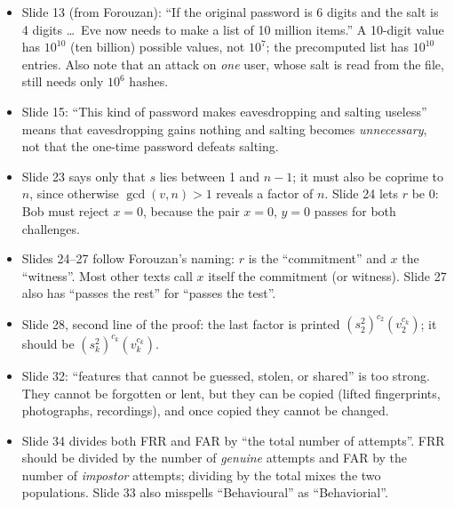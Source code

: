 \begin{fixbox}
\begin{itemize}
  \item Slide 13 (from Forouzan): ``If the original password is 6 digits and the salt is 4 digits \dots\ Eve now needs to make a list of 10 million items.'' A 10-digit value has $10^{10}$ (ten billion) possible values, not $10^{7}$; the precomputed list has $10^{10}$ entries. Also note that an attack on \emph{one} user, whose salt is read from the file, still needs only $10^6$ hashes.
  \item Slide 15: ``This kind of password makes eavesdropping and salting useless'' means that eavesdropping gains nothing and salting becomes \emph{unnecessary}, not that the one-time password defeats salting.
  \item Slide 23 says only that $s$ lies between 1 and $n - 1$; it must also be coprime to $n$, since otherwise $\gcd(v, n) > 1$ reveals a factor of $n$. Slide 24 lets $r$ be 0: Bob must reject $x = 0$, because the pair $x = 0$, $y = 0$ passes for both challenges.
  \item Slides 24--27 follow Forouzan's naming: $r$ is the ``commitment'' and $x$ the ``witness''. Most other texts call $x$ itself the commitment (or witness). Slide 27 also has ``passes the rest'' for ``passes the test''.
  \item Slide 28, second line of the proof: the last factor is printed $(s_2^2)^{c_2}(v_2^{c_k})$; it should be $(s_k^2)^{c_k}(v_k^{c_k})$.
  \item Slide 32: ``features that cannot be guessed, stolen, or shared'' is too strong. They cannot be forgotten or lent, but they can be copied (lifted fingerprints, photographs, recordings), and once copied they cannot be changed.
  \item Slide 34 divides both FRR and FAR by ``the total number of attempts''. FRR should be divided by the number of \emph{genuine} attempts and FAR by the number of \emph{impostor} attempts; dividing by the total mixes the two populations. Slide 33 also misspells ``Behavioural'' as ``Behaviorial''.
\end{itemize}
\end{fixbox}
